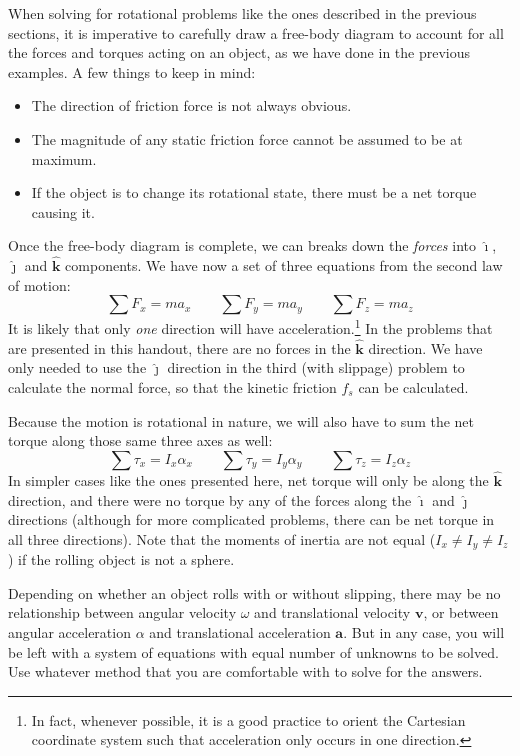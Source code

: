 \documentclass[11pt]{article}
\newcommand{\mb}[1]{\mathbf{#1}}
\newcommand{\iii}{\bm{\hat{\imath}}}
\newcommand{\jjj}{\bm{\hat{\jmath}}}
\newcommand{\kkk}{\bm{\hat{k}}}
\begin{document}
When solving for rotational problems like the ones described in the previous
sections, it is imperative to carefully draw a free-body diagram to account for
all the forces and torques acting on an object, as we have done in the previous
examples. A few things to keep in mind:
\begin{itemize}[noitemsep,topsep=0pt]
\item The direction of friction force is not always obvious.
\item The magnitude of any static friction force cannot be assumed to be at
  maximum.
\item If the object is to change its rotational state, there must be a net
  torque causing it.
\end{itemize}
Once the free-body diagram is
complete, we can breaks down the \emph{forces} into $\iii$, $\jjj$ and $\kkk$
components. We have now a set of three equations from the second law of motion:
\begin{equation*}
  \sum F_x=ma_x\quad\quad \sum F_y=ma_y\quad\quad \sum F_z=ma_z
\end{equation*}
It is likely that only \emph{one} direction will have acceleration.\footnote{In
  fact, whenever possible, it is a good practice to orient the Cartesian
  coordinate system such that acceleration only occurs in one direction.} In
the problems that are presented in this handout, there are no forces in the
$\kkk$ direction. We have only needed to use the $\jjj$ direction in the third
(with slippage) problem to calculate the normal force, so that the kinetic
friction $f_s$ can be calculated.

Because the motion is rotational in nature, we will also have to sum the net
torque along those same three axes as well:
\begin{equation*}
  \sum\tau_x=I_x\alpha_x\quad\quad \sum\tau_y=I_y\alpha_y\quad\quad 
  \sum\tau_z=I_z\alpha_z
\end{equation*}
In simpler cases like the ones presented here, net torque will only be along
the $\kkk$ direction, and there were no torque by any of the forces along the
$\iii$ and $\jjj$ directions (although for more complicated problems, there can
be net torque in all three directions). Note that the moments of inertia are
not equal ($I_x\neq I_y\neq I_z$) if the rolling object is not a sphere.

Depending on whether an object rolls with or without slipping, there may be
no relationship between angular velocity $\omega$ and translational velocity
$\mb{v}$, or between angular acceleration $\alpha$ and translational
acceleration $\mb{a}$. But in any case, you will be left with a system of
equations with equal number of unknowns to be solved. Use whatever method that
you are comfortable with to solve for the answers.
\end{document}
